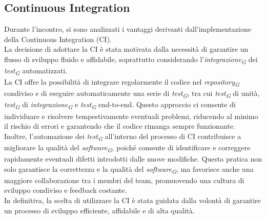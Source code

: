 \documentclass{article}
\begin{document}
    \subsection{Continuous Integration}
    Durante l'incontro, si sono analizzati i vantaggi derivanti dall'implementazione della Continuous Integration (CI). \\
    La decisione di adottare la CI è stata motivata dalla necessità di garantire un flusso di sviluppo fluido e affidabile, soprattutto considerando l'\textit{integrazione}\textsubscript{\textit{G}} dei \textit{test}\textsubscript{\textit{G}} automatizzati.\\
    La CI offre la possibilità di integrare regolarmente il codice nel \textit{repository}\textsubscript{\textit{G}} condiviso e di eseguire automaticamente una serie di \textit{test}\textsubscript{\textit{G}}, tra cui \textit{test}\textsubscript{\textit{G}} di unità, \textit{test}\textsubscript{\textit{G}} di \textit{integrazione}\textsubscript{\textit{G}} e \textit{test}\textsubscript{\textit{G}} end-to-end. Questo approccio ci consente di individuare e risolvere tempestivamente eventuali problemi, riducendo al minimo il rischio di errori e garantendo che il codice rimanga sempre funzionante.\\
    Inoltre, l'automazione dei \textit{test}\textsubscript{\textit{G}} all'interno del processo di CI contribuisce a migliorare la qualità del \textit{software}\textsubscript{\textit{G}}, poiché consente di identificare e correggere rapidamente eventuali difetti introdotti dalle nuove modifiche. Questa pratica non solo garantisce la correttezza e la qualità del \textit{software}\textsubscript{\textit{G}}, ma favorisce anche una maggiore collaborazione tra i membri del team, promuovendo una cultura di sviluppo condiviso e feedback costante.\\
    In definitiva, la scelta di utilizzare la CI è stata guidata dalla volontà di garantire un processo di sviluppo efficiente, affidabile e di alta qualità.
\end{document}
